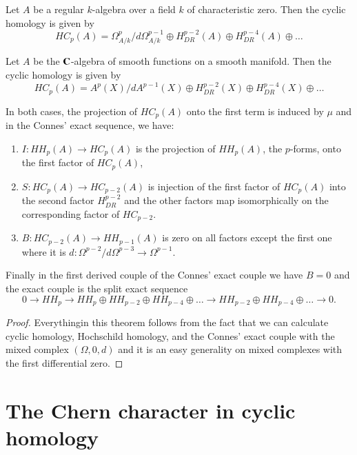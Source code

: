 \begin{theorem}\label{chap6-thm5.5}
Let $A$ be a regular $k$-algebra over a field $k$ of characteristic
zero. Then the cyclic homology is given by
$$
HC_{p}(A)=\Omega^{p}_{A/k}/d\Omega^{p-1}_{A/k}\oplus
H^{p-2}_{DR}(A)\oplus H^{p-4}_{DR}(A)\oplus\ldots
$$

Let $A$ be the $\mathbf{C}$-algebra of smooth functions on a smooth
manifold. Then the cyclic homology is given by
$$
HC_{p}(A)=A^{p}(X)/dA^{p-1}(X)\oplus H^{p-2}_{DR}(X)\oplus
H^{p-4}_{DR}(X)\oplus\ldots 
$$

In both cases, the projection of $HC_{p}(A)$ onto the first term is
induced by $\mu$ and in the Connes' exact sequence, we have:
\begin{enumerate}
\renewcommand{\labelenumi}{\rm\theenumi.}
\item $I:HH_{p}(A)\to HC_{p}(A)$ is the projection of $HH_{p}(A)$, the
  $p$-forms, onto the first factor of $HC_{p}(A)$,

\item $S:HC_{p}(A)\to HC_{p-2}(A)$ is injection of the first factor of
  $HC_{p}(A)$ into the second factor $H^{p-2}_{DR}$ and the other
  factors map isomorphically on the corresponding factor of
  $HC_{p-2}$.

\item $B:HC_{p-2}(A)\to HH_{p-1}(A)$ is zero on all factors except the
  first one where it is $d:\Omega^{p-2}/d\Omega^{p-3}\to \Omega^{p-1}$.
\end{enumerate}

Finally in the first derived couple of the Connes' exact couple we
have $B=0$ and the exact couple is the split exact sequence
$$
0\to HH_{p}\to HH_{p}\oplus HH_{p-2}\oplus HH_{p-4}\oplus\ldots\to
HH_{p-2}\oplus HH_{p-4}\oplus\ldots\to 0.
$$
\end{theorem}

\begin{proof}
Everything\pageoriginale in this theorem follows from the fact that we
can calculate cyclic homology, Hochschild homology, and the Connes'
exact couple with the mixed complex $(\Omega,0,d)$ and it is an easy
generality on mixed complexes with the first differential zero.
\end{proof}

\section{The Chern character in cyclic
  homology}\label{chap6-sec6}

